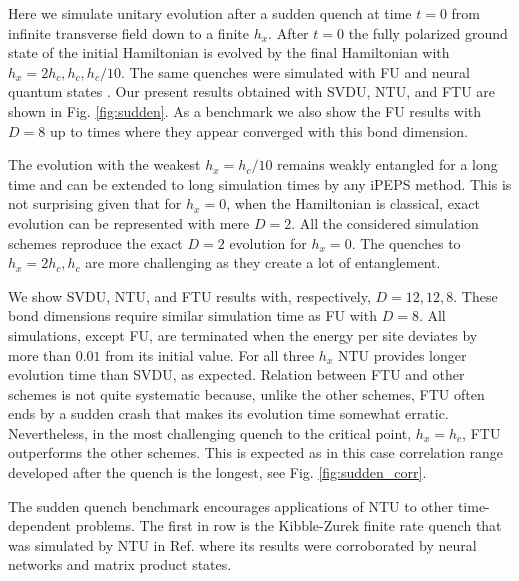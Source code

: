 \documentclass[prb,twocolumn,showkeys,showpacs,amsmath,amsfonts,floatfix,superscriptaddress,nofootinbib]{revtex4-1}
\begin{document}
Here we simulate unitary evolution after a sudden quench at time $t=0$ from infinite transverse field down to a finite $h_x$. After $t=0$ the fully polarized ground state of the initial Hamiltonian is evolved by the final Hamiltonian with $h_x=2h_c,h_c,h_c/10$. The same quenches were simulated with FU \cite{CzarnikDziarmagaCorboz} and neural quantum states \cite{ANN_Markus&Markus}. Our present results obtained with SVDU, NTU, and FTU are shown in Fig. \ref{fig:sudden}. As a benchmark we also show the FU results with $D=8$ up to times where they appear converged with this bond dimension. 

The evolution with the weakest $h_x=h_c/10$ remains weakly entangled for a long time and can be extended to long simulation times by any iPEPS method. This is not surprising given that for $h_x=0$, when the Hamiltonian is classical, exact evolution can be represented with mere $D=2$. All the considered simulation schemes reproduce the exact $D=2$ evolution for $h_x=0$. The quenches to $h_x=2h_c,h_c$ are more challenging as they create a lot of entanglement. 

We show SVDU, NTU, and FTU results with, respectively, $D=12,12,8$. These bond dimensions require similar simulation time as FU with $D=8$. All simulations, except FU, are terminated when the energy per site deviates by more than $0.01$ from its initial value. For all three $h_x$ NTU provides longer evolution time than SVDU, as expected. Relation between FTU and other schemes is not quite systematic because, unlike the other schemes, FTU often ends by a sudden crash that makes its evolution time somewhat erratic. Nevertheless, in the most challenging quench to the critical point, $h_x=h_c$, FTU outperforms the other schemes. This is expected as in this case correlation range developed after the quench is the longest, see Fig. \ref{fig:sudden_corr}.

The sudden quench benchmark encourages applications of NTU to other time-dependent problems. The first in row is the Kibble-Zurek finite rate quench that was simulated by NTU in Ref.  where its results were corroborated by neural networks \cite{ANN_Markus&Markus} and matrix product states.   
\end{document}
